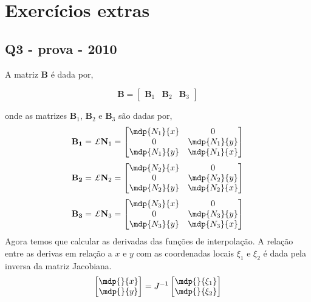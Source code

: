 \section{Exercícios extras}

\subsection{Q3 - prova - 2010}

A matriz $\mathbf{B}$ é dada por,

\begin{equation}
	\mathbf{B} =
	\begin{bmatrix}
	\mathbf{B}_1&  \mathbf{B}_2& \mathbf{B}_3
	\end{bmatrix}
\end{equation} 

onde as matrizes $\mathbf{B}_1$, $\mathbf{B}_2$ e $\mathbf{B}_3$ são dadas por,
%
\begin{equation}
	\mathbf{B_1} = \pounds \mathbf{N}_1 = 
	\begin{bmatrix}
		\mdp{N_1}{x}& 0\\
    	           0& \mdp{N_1}{y}\\
		\mdp{N_1}{y}& \mdp{N_1}{x}
	\end{bmatrix}
\end{equation}
%
\begin{equation}
	\mathbf{B_2} = \pounds \mathbf{N}_2 = 
	\begin{bmatrix}
		\mdp{N_2}{x}& 0\\
		0& \mdp{N_2}{y}\\
		\mdp{N_2}{y}& \mdp{N_2}{x}
	\end{bmatrix}
\end{equation}
%
\begin{equation}
	\mathbf{B_3} = \pounds \mathbf{N}_3 = 
	\begin{bmatrix}
		\mdp{N_3}{x}& 0\\
		0& \mdp{N_3}{y}\\
		\mdp{N_3}{y}& \mdp{N_3}{x}
	\end{bmatrix}
\end{equation}
%
Agora temos que calcular as derivadas das funções de interpolação. A relação entre as derivas em relação a $x$ e $y$ com as coordenadas locais $\xi_1$ e $\xi_2$ é dada pela inversa da matriz Jacobiana.
%
\begin{equation}
	\begin{bmatrix}
		\mdp{}{x}\\
		\mdp{}{y}
	\end{bmatrix} = J^{-1} 
	\begin{bmatrix}
	\mdp{}{\xi_1}\\
	\mdp{}{\xi_2}	
	\end{bmatrix}
	\label{provas:derivada_jacobiano}
\end{equation}
